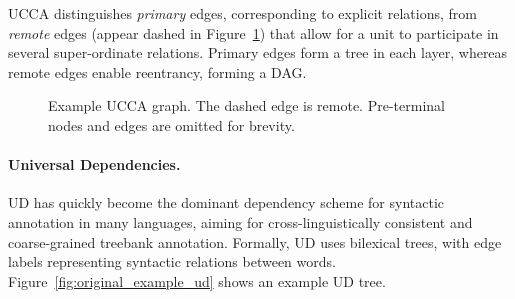 \documentclass[11pt,a4paper]{article}
\begin{document}
UCCA distinguishes \textit{primary} edges, corresponding 
to explicit relations, from \textit{remote} edges (appear dashed in
Figure~\ref{fig:example_ucca}) that allow for a unit to participate
in several super-ordinate relations.
Primary edges form a tree in each layer, whereas remote edges enable reentrancy, forming a DAG.


\begin{figure}[!ht]
  \centering
\caption{\label{fig:example_ucca}
 Example UCCA graph. The dashed edge is remote.
  Pre-terminal nodes and edges are omitted for brevity.}
\end{figure}

\paragraph{Universal Dependencies.}\label{sec:ud}
UD \cite{nivre2016universal} has quickly become
the dominant dependency scheme for
syntactic  annotation in many languages,
aiming for cross-linguistically consistent and coarse-grained treebank
annotation. Formally, UD uses bilexical trees, with edge labels 
representing syntactic relations between words.
Figure~\ref{fig:original_example_ud} shows an example UD tree.
\end{document}
